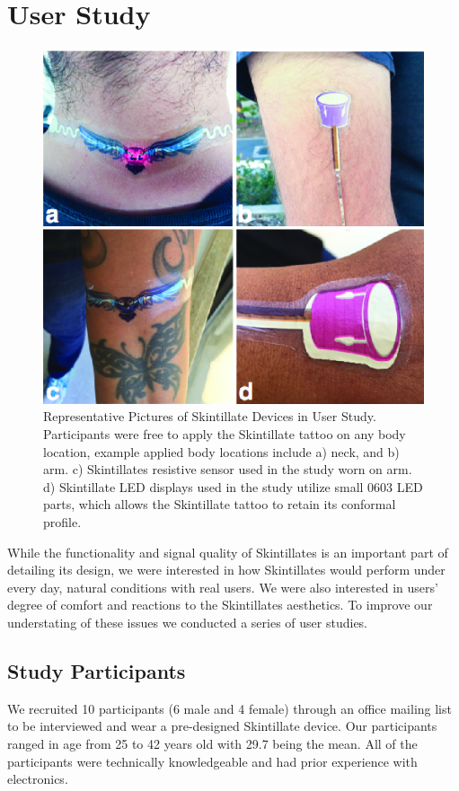 \documentclass{sigchi}
\begin{document}
\section {User Study}
\begin{figure} [b!]
\centering
\includegraphics[width=1\columnwidth]{figures/Figure11}
\caption{Representative Pictures of Skintillate Devices in User Study. Participants were free to apply the Skintillate tattoo on any body location, example applied body locations include a) neck, and b) arm. c) Skintillates resistive sensor used in the study worn on arm. d) Skintillate LED displays used in the study utilize small 0603 LED parts, which allows the Skintillate tattoo to retain its conformal profile. }
\vspace{-8pt}
\label{fig:userstudy}
\end{figure}
While the functionality and signal quality of Skintillates is an important part of detailing its design, we were interested in how Skintillates would perform under every day, natural conditions with real users.  We were also interested in users’ degree of comfort and reactions to the Skintillates aesthetics.  To improve our understating of these issues we conducted a series of user studies.
\subsection {Study Participants}
We recruited 10 participants (6 male and 4 female) through an office mailing list to be interviewed and wear a pre-designed Skintillate device.  Our participants ranged in age from 25 to 42 years old with 29.7 being the mean.   All of the participants were technically knowledgeable and had prior experience with electronics.
\end{document}
